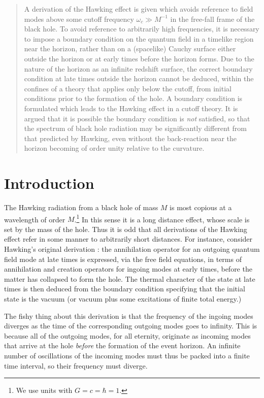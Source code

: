 \begin{abstract}
A derivation of the Hawking effect is given which avoids
reference to field modes above some cutoff frequency
$\omega_c\gg M^{-1}$ in the free-fall frame of the black
hole. To avoid reference to arbitrarily high frequencies, it
is necessary to impose a boundary condition on the quantum
field in a timelike region near the horizon, rather than on
a (spacelike) Cauchy surface either outside the horizon or
at early times before the horizon forms. Due to the nature
of the horizon as an infinite redshift surface, the correct
boundary condition at late times outside the horizon cannot
be deduced, within the confines of a theory that applies only
below the cutoff, from initial conditions prior to the formation of
the hole. A boundary condition is formulated which leads to the
Hawking effect in a cutoff theory.
It is argued that it is possible the
boundary condition is {\it not} satisfied, so that the
spectrum of black hole radiation may be significantly
different from that predicted by Hawking, even without the
back-reaction near the horizon becoming of order unity relative
to the curvature.
\end{abstract}

\newpage

\section{Introduction}
\label{sec:1}

The Hawking radiation from a black hole of mass $M$ is most
copious at a wavelength of order $M$.\footnote{We use
units with $G=c=\hbar=1$.} In this sense it is a long
distance effect, whose scale is set by the mass of the hole.
Thus it is odd that all derivations of the Hawking
effect refer in some manner to arbitrarily short distances.
For instance, consider Hawking's original derivation
\cite{Hawk75}: the annihilation operator for an outgoing quantum
field mode at late times is expressed, via the free field
equations, in terms of annihilation and creation operators
for ingoing modes at early times, before the matter has
collapsed to form the hole. The thermal character of the
state at late times is then deduced from the boundary
condition specifying that the initial state is the vacuum
(or vacuum plus some excitations of finite total energy.)

The fishy thing about this derivation is that the frequency
of the ingoing modes diverges as the time of the corresponding
outgoing modes goes to infinity. This is because all of the
outgoing modes, for all eternity, originate as incoming
modes that arrive at the hole {\it before} the formation of
the event horizon. An infinite number of oscillations of the
incoming modes must thus be packed into a finite time
interval, so their frequency must diverge.

